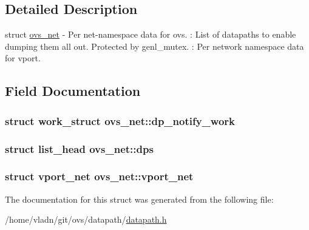 \subsection{Detailed Description}
struct \hyperlink{structovs__net}{ovs\+\_\+net} -\/ Per net-\/namespace data for ovs. \+: List of datapaths to enable dumping them all out. Protected by genl\+\_\+mutex. \+: Per network namespace data for vport. 

\subsection{Field Documentation}
\hypertarget{structovs__net_ac8cdb834420a37531f032e526ac61901}{}
\subsubsection[{dp\+\_\+notify\+\_\+work}]{\setlength{\rightskip}{0pt plus 5cm}struct work\+\_\+struct ovs\+\_\+net\+::dp\+\_\+notify\+\_\+work}\label{structovs__net_ac8cdb834420a37531f032e526ac61901}
\hypertarget{structovs__net_a0490101f7ea82f5c290a92d447bd8f9d}{}
\subsubsection[{dps}]{\setlength{\rightskip}{0pt plus 5cm}struct list\+\_\+head ovs\+\_\+net\+::dps}\label{structovs__net_a0490101f7ea82f5c290a92d447bd8f9d}
\hypertarget{structovs__net_a78aa4fb59e11c125ba6a61917efe6c50}{}
\subsubsection[{vport\+\_\+net}]{\setlength{\rightskip}{0pt plus 5cm}struct {\bf vport\+\_\+net} ovs\+\_\+net\+::vport\+\_\+net}\label{structovs__net_a78aa4fb59e11c125ba6a61917efe6c50}


The documentation for this struct was generated from the following file\+:\begin{DoxyCompactItemize}
\item 
/home/vladn/git/ovs/datapath/\hyperlink{datapath_8h}{datapath.\+h}\end{DoxyCompactItemize}
